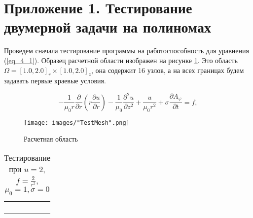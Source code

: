\hypertarget{a1}{}
\chapter*{Приложение 1. Тестирование двумерной задачи на полиномах}

Проведем сначала тестирование программы на работоспособность для уравнения (\ref{eq_4_1}). Образец расчетной области изображен на рисунке \ref{fig:exampleOf3DMesh}. Это область $\Omega = [1.0, 2.0]_r \times [1.0, 2.0]_z$, она содержит 16 узлов, а на всех границах будем задавать первые краевые условия.

\begin{equation} \label{eq_4_1}
	-\frac{1}{\mu_0 r} \frac{\partial}{\partial r} \left(r \frac{\partial u}{\partial r}\right) - \frac{1}{\mu_0} \frac{\partial^2 u}{\partial z^2} + \frac{u}{\mu_0 r^2} + \sigma \frac{\partial A_{\varphi}}{\partial t} = f,
\end{equation}

\begin{figure}
	\centering
	\texttt{[image: images/"TestMesh".png]}
	\caption{Расчетная область}
	\label{fig:exampleOf3DMesh}
\end{figure}

\begin{table}
	\caption{Тестирование при $u = 2$, $f = \frac{2}{r^2}$, $\mu_0 = 1,\sigma = 0$}
	\centering
	\small
	\begin{tabularx}{1.0\textwidth}{| >{\raggedright\arraybackslash}X | >{\raggedright\arraybackslash}X | >{\raggedright\arraybackslash}X |>{\raggedright\arraybackslash}X |}
		\hline
		\centering{Узел} & \centering{Значение} & \centering{Абсолютная погрешность} & \centering{Относительная погрешность} \tabularnewline \hline
		
		
		
		\centering{(${}^4/_3$; ${}^4/_3$)} & \centering{2.00226896E+000}& \centering{2.26896083E-003} & \centering{1.13448042E-003} \tabularnewline \hline
		
		\centering{(${}^5/_3$; ${}^4/_3$)} & \centering{2.00130487E+000} & \centering{1.30486533E-003} & \centering{6.52432666E-004} \tabularnewline \hline
		
		\centering{(${}^4/_3$; ${}^5/_3$)} & \centering{2.00226896E+000} & \centering{2.26896083E-003} & \centering{1.13448042E-003} \tabularnewline \hline
		
		\centering{(${}^5/_3$; ${}^5/_3$)} & \centering{2.00130487E+000} & \centering{1.30486533E-003} & \centering{6.52432666E-004} \tabularnewline \hline
		
	\end{tabularx}
	\label{tab:test1}
\end{table}

